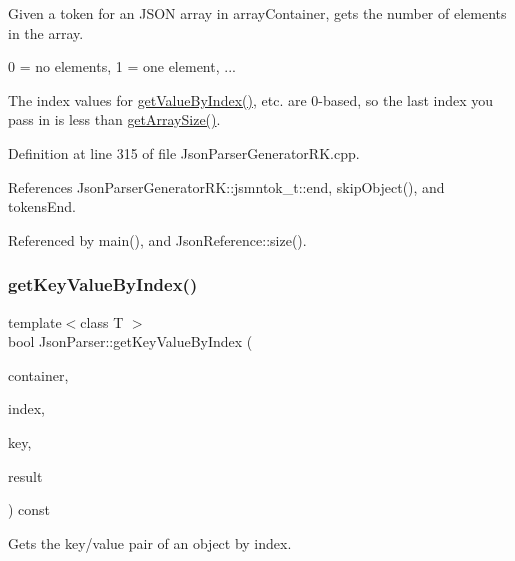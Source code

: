 Given a token for an J\+S\+ON array in array\+Container, gets the number of elements in the array. 

0 = no elements, 1 = one element, ...

The index values for \hyperlink{class_json_parser_a53bd8a6ebb0d9b246b876653e792368f}{get\+Value\+By\+Index()}, etc. are 0-\/based, so the last index you pass in is less than \hyperlink{class_json_parser_aeb46af21c13fa2396e065543bd8db265}{get\+Array\+Size()}. 

Definition at line 315 of file Json\+Parser\+Generator\+R\+K.\+cpp.



References Json\+Parser\+Generator\+R\+K\+::jsmntok\+\_\+t\+::end, skip\+Object(), and tokens\+End.



Referenced by main(), and Json\+Reference\+::size().

\mbox{\label{class_json_parser_a5759f53499dcb4418e07e9c5e1a42442}} 
\subsubsection{\texorpdfstring{get\+Key\+Value\+By\+Index()}{getKeyValueByIndex()}}
{\footnotesize\ttfamily template$<$class T $>$ \\
bool Json\+Parser\+::get\+Key\+Value\+By\+Index (\begin{DoxyParamCaption}\item[{const \hyperlink{struct_json_parser_generator_r_k_1_1jsmntok__t}{Json\+Parser\+Generator\+R\+K\+::jsmntok\+\_\+t} $\ast$}]{container,  }\item[{size\+\_\+t}]{index,  }\item[{\hyperlink{class_string}{String} \&}]{key,  }\item[{T \&}]{result }\end{DoxyParamCaption}) const\hspace{0.3cm}{\ttfamily [inline]}}



Gets the key/value pair of an object by index. 


